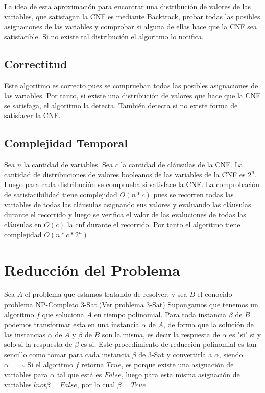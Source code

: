 \documentclass[article]{llncs}
\begin{document}
La idea de esta aproximaci\'on para encontrar una distribuci\'on de valores de las variables, que satisfagan la CNF es 
mediante Backtrack, probar todas las posibles asignaciones de las variables y comprobar si alguna de ellas hace 
que la CNF sea satisfacible. Si no existe tal distribuci\'on el algoritmo lo notifica.

\subsection{Correctitud}
Este algoritmo es correcto pues se comprueban todas las posibles asignaciones de las variables. Por tanto, si existe 
una distribuci\'on de valores que hace que la CNF se satisfaga, el algoritmo la detecta. Tambi\'en detecta si no existe 
forma de satisfacer la CNF.

\subsection{Complejidad Temporal}
Sea $n$ la cantidad de variables. Sea $c$ la cantidad de cl\'ausulas de la CNF. La cantidad de distribuciones de valores booleanos 
de las variables de la CNF es $2^n$. Luego para 
cada distribuci\'on se comprueba si satisface la CNF. La comprobaci\'on de satisfacibilidad tiene complejidad 
$O(n*c)$ pues se recorren todas las variables de todas las cl\'ausulas asignando sus valores y evaluando las cl\'ausulas durante el recorrido y luego se 
verifica el valor de las evaluciones de todas las cl\'ausulas en $O(c)$ la cnf durante el recorrido. Por tanto el algoritmo tiene complejidad $O(n*c*2^n)$


\section{Reducción del Problema}

Sea $A$ el problema que estamos tratando de resolver, y sea $B$ el conocido problema NP-Completo 3-Sat.(Ver problema 3-Sat) Supongamos que tenemos un algoritmo $f$
que soluciona $A$ en tiempo polinomial. Para toda instancia $\beta$ de $B$ podemos transformar esta en una instancia $\alpha $ de $A$, de forma que la solución
de las instancias $\alpha $ de $A$ y $\beta $ de $B$ son la misma, es decir la respuesta de $\alpha $ es "si" si y solo si
la respuesta de $\beta $ es si. Este procedimiento de reducción polinomial es tan sencillo como tomar para cada instancia $\beta $ de 3-Sat
y convertirla a $\alpha $, siendo $\alpha  = \lnot $. Si el algoritmo $f$ retorna $True$, es porque existe una asignación de variables
para $\alpha $ tal que está es $False$, luego para esta misma asignación de variables $lnot \beta  = False$, por lo cual $\beta  = True$
\end{document}
